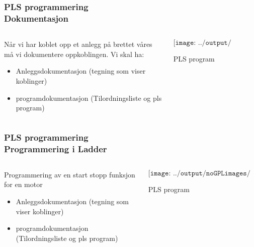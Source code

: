 \documentclass[aspectratio=169,xcolor=dvipsnames]{beamer}
\begin{document}
\begin{frame}
	\frametitle{PLS programmering \\ Dokumentasjon}
	\begin{columns}
		\begin{column}{0.3\textwidth}
			Når vi har koblet opp et anlegg på brettet våres må vi dokumentere oppkoblingen. Vi skal ha: 
			\begin{itemize}
				\item Anleggsdokumentasjon (tegning som viser koblinger)
				\item programdokumentasjon (Tilordningsliste og pls program)
			\end{itemize}

			
		\end{column}

		\begin{column}{0.7\textwidth}
	$$\texttt{[image: ../output/noGPLimages/pTIFPLCx04.png]}$$
	\begin{center}
	PLS program
	\end{center}
		\end{column}
	\end{columns}
\end{frame}
\begin{frame}
	\frametitle{PLS programmering \\ Programmering i Ladder}
	\begin{columns}
		\begin{column}{0.3\textwidth}
			Programmering av en start stopp funksjon for en motor
			\begin{itemize}
				\item Anleggsdokumentasjon (tegning som viser koblinger)
				\item programdokumentasjon (Tilordningsliste og pls program)
			\end{itemize}

			
		\end{column}

		\begin{column}{0.7\textwidth}
	$$\texttt{[image: ../output/noGPLimages/pTIFPLCx04.png]}$$
	\begin{center}
	PLS program
	\end{center}
		\end{column}
	\end{columns}
\end{frame}
\end{document}
